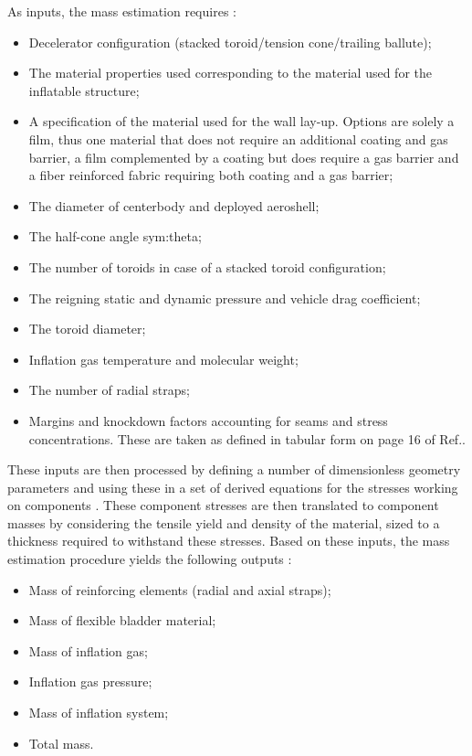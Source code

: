As inputs, the mass estimation requires \cite{Samareh2011}:
\begin{itemize}
\item Decelerator configuration (stacked toroid/tension cone/trailing ballute);
\item The material properties used corresponding to the material used for the inflatable structure; 
\item A specification of the material used for the wall lay-up. Options are solely a film, thus one material that does not require an additional coating and gas barrier, a film complemented by a coating but does require a gas barrier and a fiber reinforced fabric requiring both coating and a gas barrier;
\item The diameter of centerbody and deployed aeroshell;
\item The half-cone angle \gls{sym:theta};
\item The number of toroids in case of a stacked toroid configuration;
\item The reigning static and dynamic pressure and vehicle drag coefficient;
\item The toroid diameter;
\item Inflation gas temperature and molecular weight;
\item The number of radial straps;
\item Margins and knockdown factors accounting for seams and stress concentrations. These are taken as defined in tabular form on page 16 of Ref.\cite{Samareh2011}.
\end{itemize}
These inputs are then processed by defining a number of dimensionless geometry parameters and using these in a set of derived equations for the stresses working on components \cite[p.12-p.14]{Samareh2011}. These component stresses are then translated to component masses by considering the tensile yield and density of the material, sized to a thickness required to withstand these stresses. Based on these inputs, the mass estimation procedure yields the following outputs \cite{Samareh2011}:
\begin{itemize}
\item Mass of reinforcing elements (radial and axial straps);
\item Mass of flexible bladder material;
\item Mass of inflation gas;
\item Inflation gas pressure;
\item Mass of inflation system;
\item Total mass.
\end{itemize}
